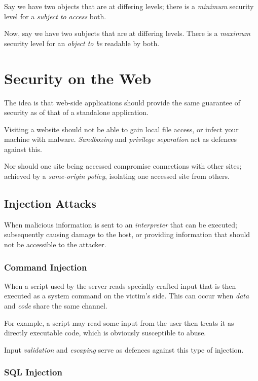 \documentclass{article}
\begin{document}
Say we have two objects that are at differing levels; there is a \textit{minimum} security level for a \textit{subject to access} both.

Now, say we have two subjects that are at differing levels. There is a \textit{maximum} security level for an \textit{object to be} readable by both.


\section{Security on the Web}

The idea is that web-side applications should provide the same guarantee of security as of that of a standalone application.

Visiting a website should not be able to gain local file access, or infect your machine with malware. \textit{Sandboxing} and \textit{privilege separation} act as defences against this.

Nor should one site being accessed compromise connections with other sites; achieved by a \textit{same-origin policy}, isolating one accessed site from others.

\subsection{Injection Attacks}

When malicious information is sent to an \textit{interpreter} that can be executed; subsequently causing damage to the host, or providing information that should not be accessible to the attacker.

\subsubsection{Command Injection}

When a script used by the server reads specially crafted input that is then executed as a system command on the victim's side. This can occur when \textit{data} and \textit{code} share the same channel.

For example, a script may read some input from the user then treats it as directly executable code, which is obviously susceptible to abuse.

Input \textit{validation} and \textit{escaping} serve as defences against this type of injection.

\subsubsection{SQL Injection}
\end{document}
